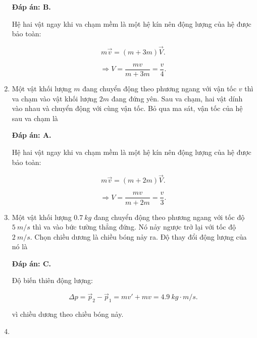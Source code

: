 \begin{enumerate}[label=\bfseries Câu \arabic*:]
	\hideall
	{	
		\textbf{Đáp án: B.}
		
		Hệ hai vật ngay khi va chạm mềm là một hệ kín nên động lượng của hệ được bảo toàn:
		
		$$m\vec v = (m+ 3m)\vec V.$$
		
		$$ \Rightarrow V = \dfrac{mv}{m + 3m} = \dfrac{v}{4}.$$
	}
	\item {}
	
	
	{Một vật khối lượng $m$ đang chuyển động theo phương ngang với vận tốc $v$ thì va chạm vào vật khối lượng $2m$ đang đứng yên. Sau va chạm, hai vật dính vào nhau và chuyển động với cùng vận tốc. Bỏ qua ma sát, vận tốc của hệ sau va chạm là 
	}
	
	\hideall
	{	
		\textbf{Đáp án: A.}
		
		Hệ hai vật ngay khi va chạm mềm là một hệ kín nên động lượng của hệ được bảo toàn:
		
		$$m\vec v = (m+ 2m)\vec V.$$
		
		$$ \Rightarrow V = \dfrac{mv}{m + 2m} = \dfrac{v}{3}.$$
	}
	\item {}
	
	
	{Một vật khối lượng $\SI{0,7}{kg}$ đang chuyển động theo phương ngang với tốc độ $\SI{5}{m/s}$ thì va vào bức tường thẳng đứng. Nó nảy ngược trở lại với tốc độ $\SI{2}{m/s}$. Chọn chiều dương là chiều bóng nảy ra. Độ thay đổi động lượng của nó là
	}
	
	\hideall
	{	
		\textbf{Đáp án: C.}
		
		Độ biến thiên động lượng:
		
		$$\Delta p = \vec p_2 - \vec p_1 = mv' + mv = \SI{4,9}{kg \cdot m/s}.$$
		
		vì chiều dương theo chiều bóng nảy.
	}
	\item {}
	

\end{enumerate}
